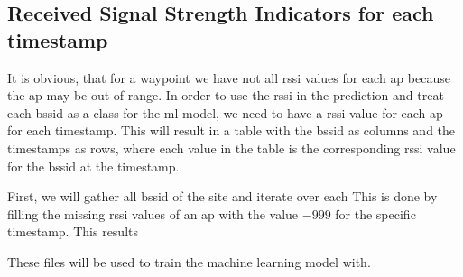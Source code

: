 \subsection{Received Signal Strength Indicators for each timestamp}
It is obvious, that for a waypoint we have not all \ac{rssi} values for each \ac{ap} because the \ac{ap} may be out of range.
In order to use the \ac{rssi} in the prediction and treat each \ac{bssid} as a class for the \ac{ml} model, we need to have a \ac{rssi} value for each \ac{ap} for each timestamp.
This will result in a table with the \ac{bssid} as columns and the timestamps as rows, where each value in the table is the corresponding \ac{rssi} value for the \ac{bssid} at the timestamp.

First, we will gather all \ac{bssid} of the site and iterate over each 
This is done by filling the missing \ac{rssi} values of an \ac{ap} with the value \(-999\) for the specific timestamp.
This results 

These files will be used to train the machine learning model with.

